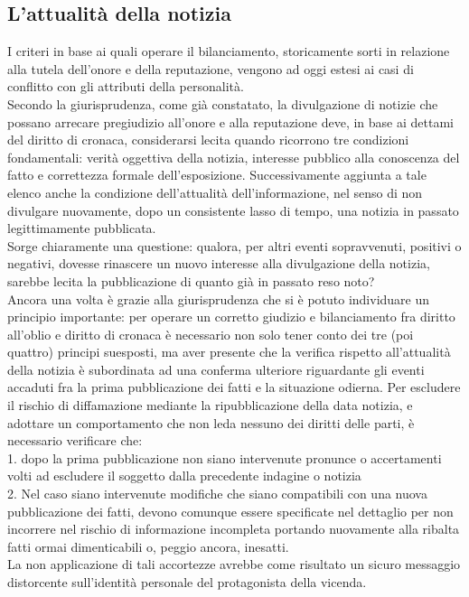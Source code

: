 \subsection{L'attualità della notizia}
I criteri in base ai quali operare il bilanciamento, storicamente sorti in relazione alla tutela dell'onore e della reputazione, vengono ad oggi estesi ai casi di conflitto con gli attributi della personalità.
\\Secondo la giurisprudenza, come già constatato, la divulgazione di notizie che possano arrecare pregiudizio all'onore e alla reputazione deve, in base ai dettami del diritto di cronaca, considerarsi lecita quando ricorrono tre condizioni fondamentali: verità oggettiva della notizia, interesse pubblico alla conoscenza del fatto e correttezza formale dell'esposizione.
Successivamente aggiunta a tale elenco anche la condizione dell'attualità dell'informazione, nel senso di non divulgare nuovamente, dopo un consistente lasso di tempo, una notizia in passato legittimamente pubblicata.
\\Sorge chiaramente una questione: qualora, per altri eventi sopravvenuti, positivi o negativi, dovesse rinascere un nuovo interesse alla divulgazione della notizia, sarebbe lecita la pubblicazione di quanto già in passato reso noto?
\\Ancora una volta è grazie alla giurisprudenza che si è potuto individuare un principio importante: per operare un corretto giudizio e bilanciamento fra diritto all'oblio e diritto di cronaca è necessario non solo tener conto dei tre (poi quattro) principi suesposti, ma aver presente che la verifica rispetto all'attualità della notizia è subordinata ad una conferma ulteriore riguardante gli eventi accaduti fra la prima pubblicazione dei fatti e la situazione odierna.
Per escludere il rischio di diffamazione mediante la ripubblicazione della data notizia, e adottare un comportamento che non leda nessuno dei diritti delle parti, è necessario verificare che:
\\1. dopo la prima pubblicazione non siano intervenute pronunce o accertamenti volti ad escludere il soggetto dalla precedente indagine o notizia
\\2. Nel caso siano intervenute modifiche che siano compatibili con una nuova pubblicazione dei fatti, devono comunque essere specificate nel dettaglio per non incorrere nel rischio di informazione incompleta portando nuovamente alla ribalta fatti ormai dimenticabili o, peggio ancora, inesatti.
\\La non applicazione di tali accortezze avrebbe come risultato un sicuro messaggio distorcente sull'identità personale del protagonista della vicenda.

